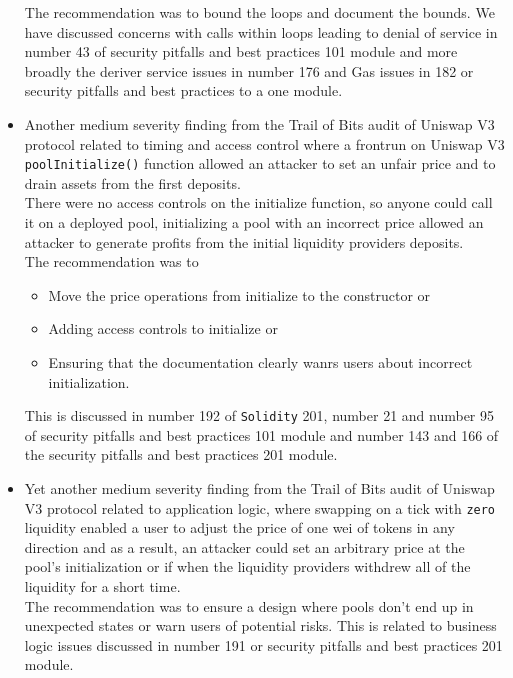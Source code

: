 \begin{itemize}
  The recommendation was to bound the loops and document the bounds. We
  have discussed concerns with calls within loops leading to denial of
  service in number 43 of security pitfalls and best practices 101
  module and more broadly the deriver service issues in number 176 and
  Gas issues in 182 or security pitfalls and best practices to a one
  module.
\item
  Another medium severity finding from the Trail of Bits audit of
  Uniswap V3 protocol related to timing and access control where a
  frontrun on Uniswap V3 \texttt{poolInitialize()} function allowed an
  attacker to set an unfair price and to drain assets from the first
  deposits.\\

  There were no access controls on the initialize function, so anyone
  could call it on a deployed pool, initializing a pool with an
  incorrect price allowed an attacker to generate profits from the
  initial liquidity providers deposits.\\

  The recommendation was to

  \begin{itemize}
  \tightlist
  \item
    Move the price operations from initialize to the constructor or
  \item
    Adding access controls to initialize or
  \item
    Ensuring that the documentation clearly wanrs users about incorrect
    initialization.
  \end{itemize}

  This is discussed in number 192 of \texttt{Solidity} 201, number 21
  and number 95 of security pitfalls and best practices 101 module and
  number 143 and 166 of the security pitfalls and best practices 201
  module.
\item
  Yet another medium severity finding from the Trail of Bits audit of
  Uniswap V3 protocol related to application logic, where swapping on a
  tick with \texttt{zero} liquidity enabled a user to adjust the price
  of one wei of tokens in any direction and as a result, an attacker
  could set an arbitrary price at the pool's initialization or if when
  the liquidity providers withdrew all of the liquidity for a short
  time.\\

  The recommendation was to ensure a design where pools don't end up in
  unexpected states or warn users of potential risks. This is related to
  business logic issues discussed in number 191 or security pitfalls and
  best practices 201 module.
\end{itemize}

